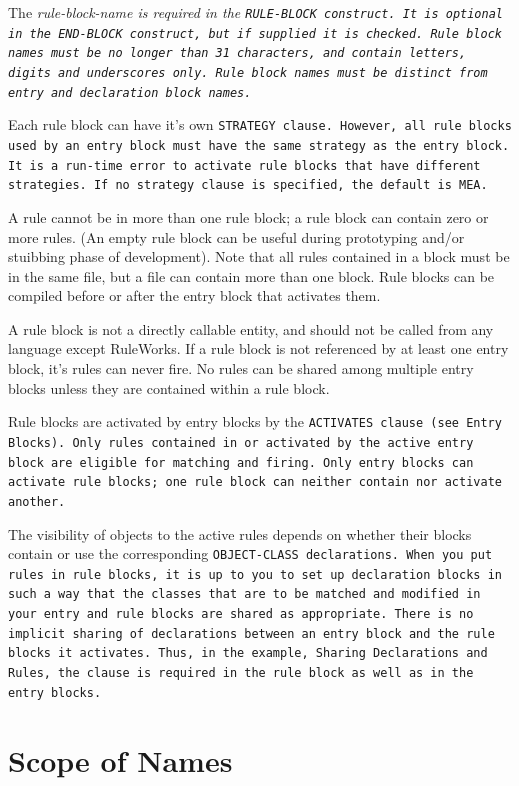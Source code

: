 The \it{rule-block-name} is required in the \tt{RULE-BLOCK}
construct. It is optional in the \tt{END-BLOCK} construct, but if
supplied it is checked. Rule block names must be no longer than 31
characters, and contain letters, digits and underscores only. Rule
block names must be distinct from entry and declaration block names.

Each rule block can have it's own \tt{STRATEGY} clause. However, all
rule blocks used by an entry block must have the same strategy as the
entry block. It is a run-time error to activate rule blocks that have
different strategies. If no strategy clause is specified, the default
is \tt{MEA}.

A rule cannot be in more than one rule block; a rule block can contain
zero or more rules.  (An empty rule block can be useful during
prototyping and/or stuibbing phase of development). Note that all
rules contained in a block must be in the same file, but a file can
contain more than one block. Rule blocks can be compiled before or
after the entry block that activates them.

\begin{note}
  A rule block is not a directly callable entity, and should not be
  called from any language except RuleWorks. If a rule block is not
  referenced by at least one entry block, it's rules can never
  fire. No rules can be shared among multiple entry blocks unless they
  are contained within a rule block.
\end{note}

Rule blocks are activated by entry blocks by the \tt{ACTIVATES} clause
(see Entry Blocks). Only rules contained in or activated by the active
entry block are eligible for matching and firing. Only entry blocks
can activate rule blocks; one rule block can neither contain nor
activate another.

The visibility of objects to the active rules depends on whether their
blocks contain or use the corresponding \tt{OBJECT-CLASS}
declarations.  When you put rules in rule blocks, it is up to you to
set up declaration blocks in such a way that the classes that are to
be matched and modified in your entry and rule blocks are shared as
appropriate. There is no implicit sharing of declarations between an
entry block and the rule blocks it activates. Thus, in the example,
Sharing Declarations and Rules, the clause is required in the rule
block as well as in the entry blocks.

\section{Scope of Names}

